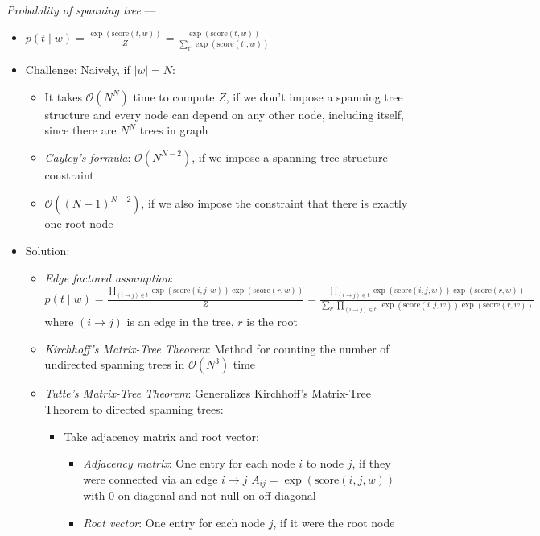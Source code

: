 \emph{Probability of spanning tree} ---
\begin{itemize}
    \item 
    $
    p(t \mid w) = \frac{\exp(\textrm{score}(t, w))}{Z} = \frac{\exp(\textrm{score}(t, w))}{\sum_{t'} \exp(\textrm{score}(t', w))}
    $ 
    \item Challenge: Naively, if $|w| = N$:
    \begin{itemize}
        \item It takes $\mathcal{O}(N^N)$ time to compute $Z$, if we don't impose a spanning tree structure and every node can depend on any other node, including itself, since there are $N^N$ trees in graph
        \item \emph{Cayley's formula}: $\mathcal{O}(N^{N-2})$, if we impose a spanning tree structure constraint
        \item $\mathcal{O}((N-1)^{N-2})$, if we also impose the constraint that there is exactly one root node
    \end{itemize}
    \item Solution: 
    \begin{itemize}
        \item \emph{Edge factored assumption}: $
        p(t \mid w) = \frac{\prod_{(i \to j) \in t} \exp(\textrm{score}(i, j, w)) \exp(\textrm{score}(r, w))}{Z} = \frac{\prod_{(i \to j) \in t} \exp(\textrm{score}(i, j, w)) \exp(\textrm{score}(r, w))}{\sum_{t'} \prod_{(i \to j) \in t'} \exp(\textrm{score}(i, j, w)) \exp(\textrm{score}(r, w))}
        $ where $(i \to j)$ is an edge in the tree, $r$ is the root 
        \item \emph{Kirchhoff's Matrix-Tree Theorem}: Method for counting the number of undirected spanning trees in $\mathcal{O}(N^3)$ time
        \item \emph{Tutte's Matrix-Tree Theorem}: Generalizes Kirchhoff's Matrix-Tree Theorem to directed spanning trees:
        \begin{itemize}
            \item Take adjacency matrix and root vector:
            \begin{itemize}
                \item \emph{Adjacency matrix}: One entry for each node $i$ to node $j$, if they were connected via an edge $i \to j$
                $
                A_{ij} = \exp(\textrm{score}(i, j, w))
                $
                with 0 on diagonal and not-null on off-diagonal
                \item \emph{Root vector}: One entry for each node $j$, if it were the root node

\end{itemize}
\end{itemize}
\end{itemize}
\end{itemize}
